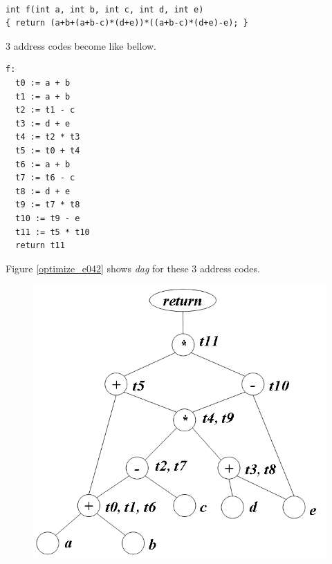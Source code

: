 \begin{Example}
\label{optimize_e041}
\begin{verbatim}

int f(int a, int b, int c, int d, int e)
{ return (a+b+(a+b-c)*(d+e))*((a+b-c)*(d+e)-e); }
\end{verbatim}
3 address codes become like bellow.
\begin{verbatim}
f:
  t0 := a + b
  t1 := a + b
  t2 := t1 - c
  t3 := d + e
  t4 := t2 * t3
  t5 := t0 + t4
  t6 := a + b
  t7 := t6 - c
  t8 := d + e
  t9 := t7 * t8
  t10 := t9 - e
  t11 := t5 * t10
  return t11
\end{verbatim}
Figure \ref{optimize_e042} shows {\em dag} for these 3 address codes.
\begin{figure}[htbp]
\begin{center}
\begin{htmlonly}
\includegraphics[width=1.051\linewidth,height=1.0\linewidth]{opt022.png}
\end{htmlonly}
\begin{latexonly}

\end{latexonly}
\end{center}
\end{figure}
\end{Example}
